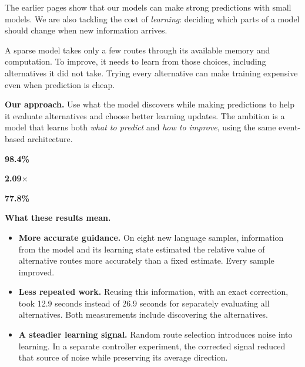 \documentclass[10pt, a4 paper]{article}
\newcommand{\stat}[2]{\begin{tile}[height=33mm,valign=center]{\color{ours}\fontsize{21}{23}\selectfont\bfseries #1}\par\vspace{3pt}{\small #2}\end{tile}}
\begin{document}
The earlier pages show that our models can make strong predictions with small
models. We are also tackling the cost of \emph{learning}: deciding which parts
of a model should change when new information arrives.

A sparse model takes only a few routes through its available memory and
computation. To improve, it needs to learn from those choices, including
alternatives it did not take. Trying every alternative can make training
expensive even when prediction is cheap.

\begin{callout}
\textbf{Our approach.} Use what the model discovers while making predictions
to help it evaluate alternatives and choose better learning updates. The
ambition is a model that learns both \emph{what to predict} and \emph{how to
improve}, using the same event-based architecture.
\end{callout}

\vspace{3mm}
\begin{minipage}[t]{.32\linewidth}\stat{98.4\%}{less error when estimating the value of alternative learning routes}\end{minipage}\hfill
\begin{minipage}[t]{.32\linewidth}\stat{2.09$\times$}{faster evaluation of alternatives in the measured experiment}\end{minipage}\hfill
\begin{minipage}[t]{.32\linewidth}\stat{77.8\%}{less randomness in the route controller's learning signal}\end{minipage}

\vspace{3mm}
\textbf{What these results mean.}
\begin{itemize}
\item \textbf{More accurate guidance.} On eight new language samples, information
from the model and its learning state estimated the relative value of alternative
routes more accurately than a fixed estimate. Every sample improved.
\item \textbf{Less repeated work.} Reusing this information, with an exact
correction, took 12.9 seconds instead of 26.9 seconds for separately evaluating
all alternatives. Both measurements include discovering the alternatives.
\item \textbf{A steadier learning signal.} Random route selection introduces noise
into learning. In a separate controller experiment, the corrected signal reduced
that source of noise while preserving its average direction.
\end{itemize}
\end{document}
